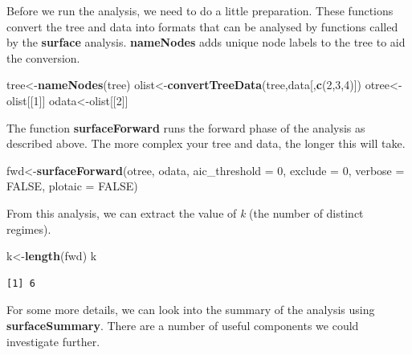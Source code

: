 \documentclass[
]{book}
\newenvironment{Shaded}{\begin{snugshade}}{\end{snugshade}}
\newcommand{\DataTypeTok}[1]{\textcolor[rgb]{0.13,0.29,0.53}{#1}}
\newcommand{\DecValTok}[1]{\textcolor[rgb]{0.00,0.00,0.81}{#1}}
\newcommand{\KeywordTok}[1]{\textcolor[rgb]{0.13,0.29,0.53}{\textbf{#1}}}
\newcommand{\NormalTok}[1]{#1}
\newcommand{\OtherTok}[1]{\textcolor[rgb]{0.56,0.35,0.01}{#1}}
\begin{document}
Before we run the analysis, we need to do a little preparation. These functions convert the tree and data into formats that can be analysed by functions called by the \textbf{surface} analysis. \textbf{nameNodes} adds unique node labels to the tree to aid the conversion.

\begin{Shaded}
\begin{Highlighting}[]
\NormalTok{tree\textless{}{-}}\KeywordTok{nameNodes}\NormalTok{(tree)}
\NormalTok{olist\textless{}{-}}\KeywordTok{convertTreeData}\NormalTok{(tree,data[,}\KeywordTok{c}\NormalTok{(}\DecValTok{2}\NormalTok{,}\DecValTok{3}\NormalTok{,}\DecValTok{4}\NormalTok{)])}
\NormalTok{otree\textless{}{-}olist[[}\DecValTok{1}\NormalTok{]]}
\NormalTok{odata\textless{}{-}olist[[}\DecValTok{2}\NormalTok{]]}
\end{Highlighting}
\end{Shaded}

The function \textbf{surfaceForward} runs the forward phase of the analysis as described above. The more complex your tree and data, the longer this will take.

\begin{Shaded}
\begin{Highlighting}[]
\NormalTok{fwd\textless{}{-}}\KeywordTok{surfaceForward}\NormalTok{(otree, odata, }\DataTypeTok{aic\_threshold =} \DecValTok{0}\NormalTok{, }\DataTypeTok{exclude =} \DecValTok{0}\NormalTok{, }
                    \DataTypeTok{verbose =} \OtherTok{FALSE}\NormalTok{, }\DataTypeTok{plotaic =} \OtherTok{FALSE}\NormalTok{)}
\end{Highlighting}
\end{Shaded}

From this analysis, we can extract the value of \emph{k} (the number of distinct regimes).

\begin{Shaded}
\begin{Highlighting}[]
\NormalTok{k\textless{}{-}}\KeywordTok{length}\NormalTok{(fwd)}
\NormalTok{k}
\end{Highlighting}
\end{Shaded}

\begin{verbatim}
[1] 6
\end{verbatim}

For some more details, we can look into the summary of the analysis using \textbf{surfaceSummary}. There are a number of useful components we could investigate further.
\end{document}
